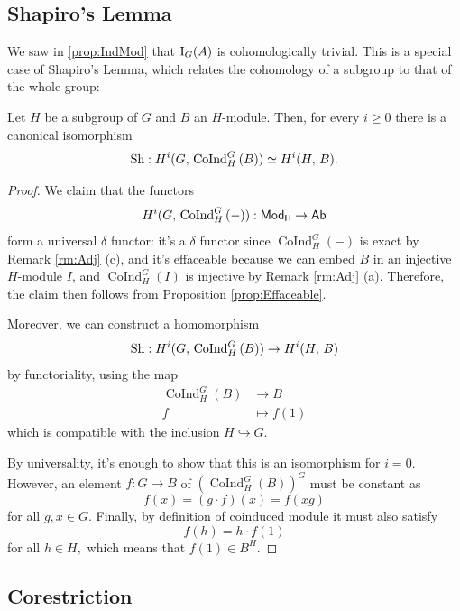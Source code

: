 \documentclass[a4paper, oneside]{memoir}
\begin{document}
\subsection{Shapiro's Lemma}
We saw in \ref{prop:IndMod} that $\operatorname{I}_{G}(A)$ is cohomologically trivial. This is a special case of Shapiro's Lemma, which relates the cohomology of a subgroup to that of the whole group:
\begin{theorem}\label{thm:Shapiro}
	Let $H$ be a subgroup of $G$ and $B$ an $H$-module. Then, for every $i\geq0$ there is a canonical isomorphism
	\[
		\operatorname{Sh}: H^{i}( G, \, \operatorname{CoInd}^G_H{(B)} )\simeq H^{i}( H, \, B ).
	\]
\end{theorem}
\begin{proof}
	We claim that the functors
	\[
		H^{i}( G, \, \operatorname{CoInd}^G_H{(-)} ): \mathsf{Mod}_\mathsf{H}\to\mathsf{Ab}
	\]
	form a universal $\delta$ functor: it's a $\delta$ functor since $\operatorname{CoInd}^G_H{(-)}$ is exact by Remark \ref{rm:Adj} (c), and it's effaceable because we can embed $B$ in an injective $H$-module $I$, and $\operatorname{CoInd}^G_H{(I)}$ is injective by Remark \ref{rm:Adj} (a).
	Therefore, the claim then follows from Proposition \ref{prop:Effaceable}.

	Moreover, we can construct a homomorphism
	\[
		\operatorname{Sh}: H^{i}( G, \, \operatorname{CoInd}^G_H{(B)} )\to H^{i}( H, \, B )
	\]
	by functoriality, using the map
	\begin{align*}
		\operatorname{CoInd}^G_H{(B)} & \to B        \\
		f                             & \mapsto f(1)
	\end{align*}
	which is compatible with the inclusion $H\hookrightarrow G$.

	By universality, it's enough to show that this is an isomorphism for $i=0$. However, an element $f:G\to B$ of $(\operatorname{CoInd}^G_H{(B)})^G$ must be constant as $$f(x)=(g\cdot f)(x)=f(xg)$$ for all $g,x\in G$. Finally, by definition of coinduced module it must also satisfy $$f(h)=h\cdot f(1)$$ for all $h\in H,$ which means that $f(1)\in B^H$.
\end{proof}

\subsection{Corestriction}
\end{document}
